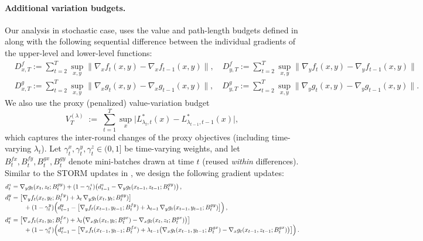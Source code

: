 \documentclass{uai2026} %
\begin{document}
\paragraph{Additional variation budgets.}
Our analysis in stochastic case, uses the value and path-length budgets defined in  along with the following sequential difference between the individual gradients of the upper-level and lower-level functions:
\begin{align}
    &D^{f}_{x,T}:=\sum_{t=2}^{T}\sup_{x,y}\|\nabla_{x}f_{t}(x,y)-\nabla_{x}f_{t-1}(x,y)\|,\quad D^{f}_{y,T}:=\sum_{t=2}^{T}\sup_{x,y}\|\nabla_{y}f_{t}(x,y)-\nabla_{y}f_{t-1}(x,y)\|\label{eq_def_sec_dif_f}\\
    &D^{g}_{x,T}:=\sum_{t=2}^{T}\sup_{x,y}\|\nabla_{x}g_{t}(x,y)-\nabla_{x}g_{t-1}(x,y)\|,\quad D^{g}_{y,T}:=\sum_{t=2}^{T}\sup_{x,y}\|\nabla_{y}g_{t}(x,y)-\nabla_{y}g_{t-1}(x,y)\|.\label{eq_def_sec_dif_g}
\end{align}
We also use the proxy (penalized) value-variation budget
\begin{equation}\label{eq:def:Vlambda}
V_T^{(\lambda)}
\;:=\;
\sum_{t=1}^{T}\sup_{x}\Big|L_{\lambda_t,t}^{*}(x)-L_{\lambda_{t-1},t-1}^{*}(x)\Big|,
\end{equation}
which captures the inter-round changes of the proxy objectives (including time-varying $\lambda_t$).
Let $\gamma_t^x,\gamma_t^y,\gamma_t^z\in(0,1]$ be time-varying weights, and let
$B_t^{fx},B_t^{fy},B_t^{gx},B_t^{gy}$ denote mini-batches drawn at time $t$ (reused \emph{within} differences).
Similar to the STORM updates in \citep{cutkosky2019momentum}, we design the following gradient updates:
\begin{subequations}\label{eq:storm}
\begin{align}
d_t^{z} 
&= \nabla_y g_t(x_t,z_t;B_t^{gy})
     +(1-\gamma_t^z)\!\left(d_{t-1}^{z}-\nabla_y g_t(x_{t-1},z_{t-1};B_t^{gy})\right), \\
d_t^{y} 
&= \big[\nabla_y f_t(x_t,y_t;B_t^{fy})+\lambda_t\,\nabla_y g_t(x_t,y_t;B_t^{gy})\big] \nonumber\\[-0.35em]
&\hspace{2.0em} +(1-\gamma_t^y)\!\left(d_{t-1}^{y}-\big[\nabla_y f_t(x_{t-1},y_{t-1};B_t^{fy})+\lambda_{t-1}\,\nabla_y g_t(x_{t-1},y_{t-1};B_t^{gy})\big]\right),\\
d_t^{x} 
&= \big[\nabla_x f_t(x_t,y_t;B_t^{fx})+\lambda_t\big(\nabla_x g_t(x_t,y_t;B_t^{gx})-\nabla_x g_t(x_t,z_t;B_t^{gx})\big)\big] \nonumber\\[-0.35em]
&\hspace{2.0em} +(1-\gamma_t^x)\!\left(d_{t-1}^{x}-\big[\nabla_x f_t(x_{t-1},y_{t-1};B_t^{fx})+\lambda_{t-1}\big(\nabla_x g_t(x_{t-1},y_{t-1};B_t^{gx})-\nabla_x g_t(x_{t-1},z_{t-1};B_t^{gx})\big)\big]\right).
\end{align}
\end{subequations}
\end{document}
